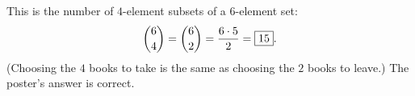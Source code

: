 This is the number of $4$-element subsets of a $6$-element set:
\[
\dbinom{6}{4}=\dbinom{6}{2}=\dfrac{6\cdot5}{2}=\boxed{15}.
\]
(Choosing the $4$ books to take is the same as choosing the $2$ books to leave.) The poster's answer is correct.
